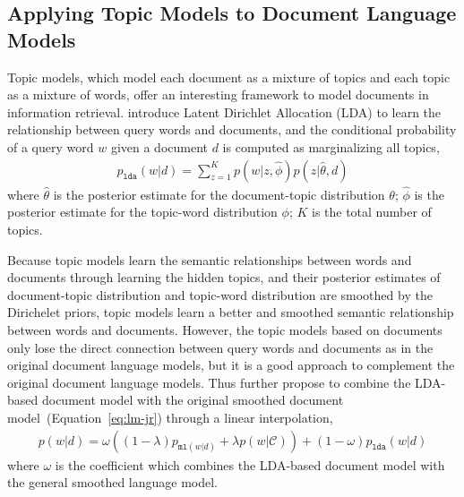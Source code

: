 
\subsection{Applying Topic Models to Document Language Models}

Topic models, which model each document as a mixture of topics and each topic as a mixture of words, offer an interesting framework to model documents in information retrieval. \cite{wei-06} introduce Latent Dirichlet Allocation (LDA) to learn the relationship between query words and documents, and the conditional probability of a query word $w$ given a document $d$ is computed as marginalizing all topics,
\begin{align}
p_{\texttt{lda}}(w|d) = \sum_{z=1}^K p(w|z, \hat{\phi}) p(z | \hat{\theta}, d)
\end{align}
where $\hat{\theta}$ is the posterior estimate for the document-topic distribution $\theta$; $\hat{\phi}$ is the posterior estimate for the topic-word distribution $\phi$; $K$ is the total number of topics.

Because topic models learn the semantic relationships between words and documents through learning the hidden topics, and their posterior estimates of document-topic distribution and topic-word distribution are smoothed by the Dirichelet priors, topic models learn a better and smoothed semantic relationship between words and documents. However, the topic models based on documents only lose the direct connection between query words and documents as in the original document language models, but it is a good approach to complement the original document language models. Thus \cite{wei-06} further propose to combine the LDA-based document model with the original smoothed document model~(Equation~\ref{eq:lm-jr}) through a linear interpolation,
\begin{align}
p(w|d) = \omega ((1 - \lambda) p_{\texttt{ml}(w|d)} + \lambda p(w|\mathcal{C})) + (1 - \omega) p_{\texttt{lda}}(w|d)
\end{align}
where $\omega$ is the coefficient which combines the LDA-based document model with the general smoothed language model.

